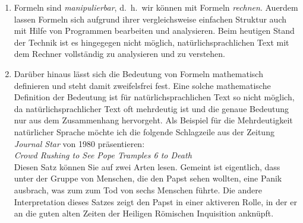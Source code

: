 \begin{enumerate}
\item Formeln sind \emph{manipulierbar}, d.~h.~wir k\"{o}nnen mit Formeln \emph{rechnen}.
      Au\3erdem lassen Formeln sich aufgrund ihrer vergleichsweise einfachen Struktur auch 
      mit Hilfe von Programmen bearbeiten und analysieren.  Beim heutigen Stand der Technik ist
      es hingegegen nicht m\"{o}glich, nat\"{u}rlichsprachlichen Text mit dem Rechner vollst\"{a}ndig
      zu analysieren und zu verstehen.
\item Dar\"{u}ber hinaus l\"{a}sst sich die Bedeutung von Formeln mathematisch definieren und
      steht damit zweifelsfrei fest.  Eine solche mathematische Definition der Bedeutung
      ist f\"{u}r nat\"{u}rlichsprachlichen Text so nicht m\"{o}glich, da
      nat\"{u}rlichsprachlicher Text oft mehrdeutig ist und die genaue Bedeutung nur
      aus dem Zusammenhang hervorgeht.  Als Beispiel f\"{u}r die Mehrdeutigkeit nat\"{u}rlicher
      Sprache m\"{o}chte ich die folgende Schlagzeile aus der Zeitung \textsl{Journal Star}
      von 1980 pr\"{a}sentieren:
      \\[0.2cm]
      \hspace*{1.3cm}
      \textsl{Crowd Rushing to See Pope Tramples 6 to Death}
      \\[0.2cm]
      Diesen Satz k\"{o}nnen Sie auf zwei Arten lesen.  Gemeint ist eigentlich, dass unter der
      Gruppe von Menschen, die den Papst sehen wollten, eine Panik ausbrach, was zum zum
      Tod von sechs Menschen f\"{u}hrte.  Die andere Interpretation dieses Satzes zeigt den
      Papst in einer aktiveren Rolle, in der er an die guten alten Zeiten der Heiligen
      R\"{o}mischen Inquisition ankn\"{u}pft.
\end{enumerate}

